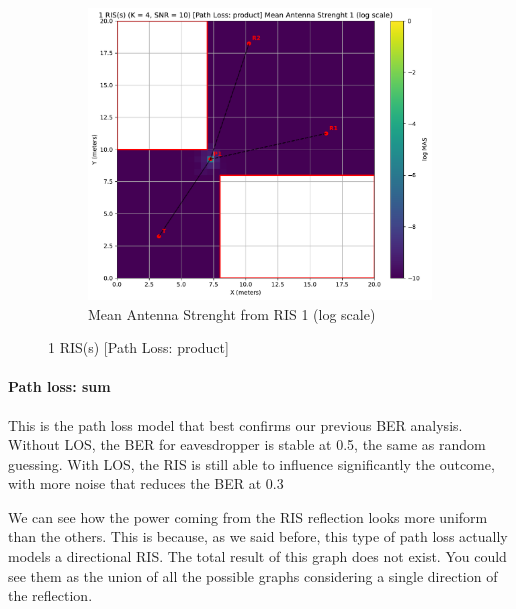 \begin{figure}[H]
\begin{subfigure}[b]{0.48\textwidth}
    \includegraphics[width=\textwidth]{imgs/heatmap-simulations/1 RIS(s) (K = 4, SNR = 10) [Path Loss: product] Mean Antenna Strenght 1 (log scale).pdf}
    \caption{Mean Antenna Strenght from RIS 1 (log scale)}
  \end{subfigure}
  \caption{1 RIS(s) [Path Loss: product]}
\end{figure}

\paragraph*{Path loss: sum}
This is the path loss model that best confirms our previous BER analysis. Without LOS, the BER for eavesdropper is stable at 0.5, the same as random guessing. With LOS, the RIS is still able to influence significantly the outcome, with more noise that reduces the BER at 0.3

We can see how the power coming from the RIS reflection looks more uniform than the others. This is because, as we said before, this type of path loss actually models a directional RIS. The total result of this graph does not exist. You could see them as the union of all the possible graphs considering a single direction of the reflection.

